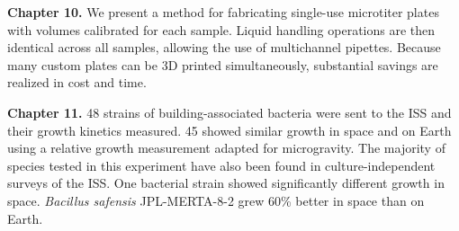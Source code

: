 \noindent\textbf{Chapter 10.} We present a method for
fabricating single-use microtiter plates with volumes calibrated for each
sample. Liquid handling operations are then identical across all samples,
allowing the use of multichannel pipettes. Because many custom plates can be
3D printed simultaneously, substantial savings are realized in cost and time.


\noindent\textbf{Chapter 11.} 48 strains of building-associated
bacteria were sent to the ISS and their growth kinetics measured. 45 showed
similar growth in space and on Earth using a relative growth measurement
adapted for microgravity. The majority of species tested in this experiment
have also been found in culture-independent surveys of the ISS. One bacterial
strain showed significantly different growth in space. {\em Bacillus safensis}
JPL-MERTA-8-2 grew 60\% better in space than on Earth.
